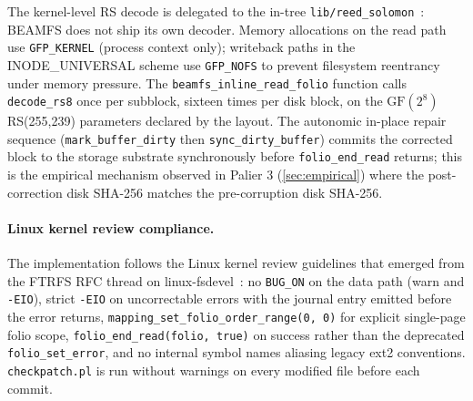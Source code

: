 The kernel-level RS decode is delegated to the in-tree
\texttt{lib/reed\_solomon}~\cite{kernelrslib}: BEAMFS does not
ship its own decoder. Memory allocations on the read path use
\texttt{GFP\_KERNEL} (process context only); writeback paths in
the INODE\_UNIVERSAL scheme use \texttt{GFP\_NOFS} to prevent
filesystem reentrancy under memory pressure. The \texttt{beamfs\_inline\_read\_folio}
function calls \texttt{decode\_rs8} once per subblock, sixteen
times per disk block, on the \(\mathrm{GF}(2^8)\) RS(255,239)
parameters declared by the layout. The autonomic in-place repair
sequence (\texttt{mark\_buffer\_dirty} then
\texttt{sync\_dirty\_buffer}) commits the corrected block to the
storage substrate synchronously before \texttt{folio\_end\_read}
returns; this is the empirical mechanism observed in Palier 3
(\cref{sec:empirical}) where the post-correction disk SHA-256
matches the pre-corruption disk SHA-256.

\paragraph{Linux kernel review compliance.}
The implementation follows the Linux kernel review guidelines that
emerged from the FTRFS RFC thread on linux-fsdevel~\cite{ftrfs-rfc-thread}: no
\texttt{BUG\_ON} on the data path (warn and \texttt{-EIO}), strict
\texttt{-EIO} on uncorrectable errors with the journal entry
emitted before the error returns,
\texttt{mapping\_set\_folio\_order\_range(0, 0)} for explicit
single-page folio scope, \texttt{folio\_end\_read(folio, true)} on
success rather than the deprecated \texttt{folio\_set\_error}, and no internal symbol names
aliasing legacy ext2 conventions. \texttt{checkpatch.pl} is run without warnings on every
modified file before each commit.

